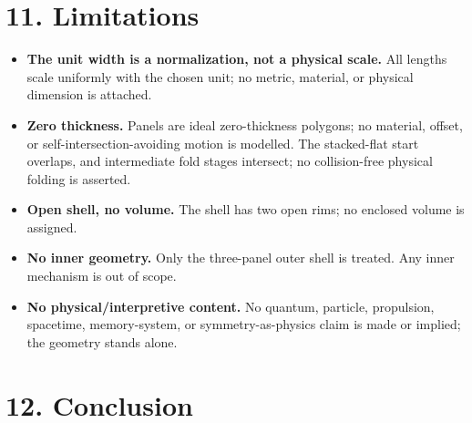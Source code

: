\documentclass[
  11pt,
  a4paper,
]{article}
\providecommand{\tightlist}{%
  \setlength{\itemsep}{0pt}\setlength{\parskip}{0pt}}
\begin{document}
\section{11. Limitations}\label{limitations}

\begin{itemize}
\tightlist
\item
  \textbf{The unit width is a normalization, not a physical scale.} All lengths scale uniformly with the chosen unit; no metric, material, or physical dimension is attached.
\item
  \textbf{Zero thickness.} Panels are ideal zero-thickness polygons; no material, offset, or self-intersection-avoiding motion is modelled. The stacked-flat start overlaps, and intermediate fold stages intersect; no collision-free physical folding is asserted.
\item
  \textbf{Open shell, no volume.} The shell has two open rims; no enclosed volume is assigned.
\item
  \textbf{No inner geometry.} Only the three-panel outer shell is treated. Any inner mechanism is out of scope.
\item
  \textbf{No physical/interpretive content.} No quantum, particle, propulsion, spacetime, memory-system, or symmetry-as-physics claim is made or implied; the geometry stands alone.
\end{itemize}

\section{12. Conclusion}\label{conclusion}
\end{document}
